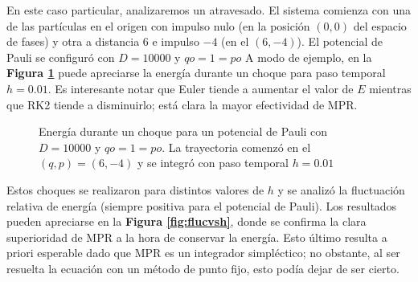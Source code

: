 \documentclass[twoside, 12pt]{article}
\begin{document}
En este caso particular, analizaremos un atravesado.
El sistema comienza con una de las partículas en el origen con impulso nulo (en la posición $(0, 0)$ del espacio de fases) y otra a distancia $6$ e impulso $-4$ (en el $(6, -4)$).
El potencial de Pauli se configuró con $D = 10000$ y $qo = 1 = po$
A modo de ejemplo, en la \textbf{Figura \ref{fig:energ_choq}} puede apreciarse la energía durante un choque para paso temporal $h=0.01$. 
Es interesante notar que Euler tiende a aumentar el valor de $E$ mientras que RK2 tiende a disminuirlo; está clara la mayor efectividad de MPR.

\begin{figure}[h]
	\centering
	\caption{Energía durante un choque para un potencial de Pauli con $D = 10000$ y $qo = 1 = po$. La trayectoria comenzó en el $(q, p) = (6, -4)$ y se integró con paso temporal $h=0.01$}
	\label{fig:energ_choq}
\end{figure}

Estos choques se realizaron para distintos valores de $h$ y se analizó la fluctuación relativa de energía (siempre positiva para el potencial de Pauli).
Los resultados pueden apreciarse en la \textbf{Figura \ref{fig:flucvsh}}, donde se confirma la clara superioridad de MPR a la hora de conservar la energía. 
Esto último resulta a priori esperable dado que MPR es un integrador simpléctico; no obstante, al ser resuelta la ecuación con un método de punto fijo, esto podía dejar de ser cierto.
\end{document}
